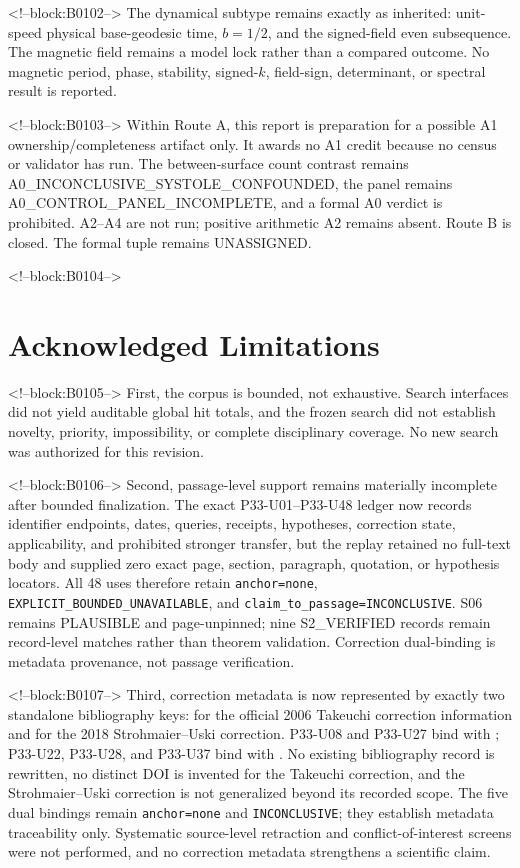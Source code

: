 \documentclass[11pt,a4paper]{article}
\begin{document}
<!--block:B0102-->
The dynamical subtype remains exactly as inherited: unit-speed physical base-geodesic time, \(b=1/2\), and the signed-field even subsequence. The magnetic field remains a model lock rather than a compared outcome. No magnetic period, phase, stability, signed-\(k\), field-sign, determinant, or spectral result is reported.

<!--block:B0103-->
Within Route A, this report is preparation for a possible A1 ownership/completeness artifact only. It awards no A1 credit because no census or validator has run. The between-surface count contrast remains A0\_INCONCLUSIVE\_SYSTOLE\_CONFOUNDED, the panel remains A0\_CONTROL\_PANEL\_INCOMPLETE, and a formal A0 verdict is prohibited. A2--A4 are not run; positive arithmetic A2 remains absent. Route B is closed. The formal tuple remains UNASSIGNED.

<!--block:B0104-->
\hypertarget{acknowledged-limitations}{%
\section{Acknowledged Limitations}\label{acknowledged-limitations}}

<!--block:B0105-->
First, the corpus is bounded, not exhaustive. Search interfaces did not yield auditable global hit totals, and the frozen search did not establish novelty, priority, impossibility, or complete disciplinary coverage. No new search was authorized for this revision.

<!--block:B0106-->
Second, passage-level support remains materially incomplete after bounded finalization. The exact P33-U01--P33-U48 ledger now records identifier endpoints, dates, queries, receipts, hypotheses, correction state, applicability, and prohibited stronger transfer, but the replay retained no full-text body and supplied zero exact page, section, paragraph, quotation, or hypothesis locators. All 48 uses therefore retain \texttt{anchor=none}, \texttt{EXPLICIT\_BOUNDED\_UNAVAILABLE}, and \texttt{claim\_to\_passage=INCONCLUSIVE}. S06 remains PLAUSIBLE and page-unpinned; nine S2\_VERIFIED records remain record-level matches rather than theorem validation. Correction dual-binding is metadata provenance, not passage verification.

<!--block:B0107-->
Third, correction metadata is now represented by exactly two standalone bibliography keys:  for the official 2006 Takeuchi correction information and  for the 2018 Strohmaier--Uski correction. P33-U08 and P33-U27 bind  with ; P33-U22, P33-U28, and P33-U37 bind  with . No existing bibliography record is rewritten, no distinct DOI is invented for the Takeuchi correction, and the Strohmaier--Uski correction is not generalized beyond its recorded scope. The five dual bindings remain \texttt{anchor=none} and \texttt{INCONCLUSIVE}; they establish metadata traceability only. Systematic source-level retraction and conflict-of-interest screens were not performed, and no correction metadata strengthens a scientific claim.
\end{document}
